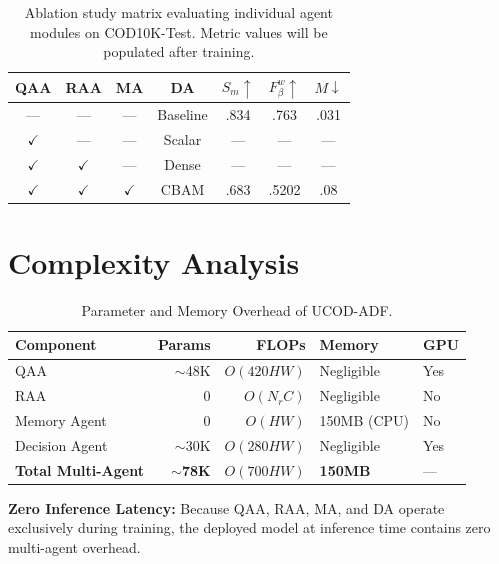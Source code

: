 \documentclass[journal,twoside,web]{IEEEtran}
\newcommand{\methodname}{UCOD-ADF}
\newcommand{\PENDING}{---}
\begin{document}
\begin{table}[h]
\centering
\caption{Ablation study matrix evaluating individual agent modules on COD10K-Test. Metric values will be populated after training.}
\label{tab:ablation}
\begin{tabular}{cccc|ccc}
\toprule
QAA & RAA & MA & DA & $S_m\uparrow$ & $F_\beta^w\uparrow$ & $M\downarrow$ \\
\midrule
--- & --- & --- & Baseline & .834 & .763 & .031 \\
$\checkmark$ & --- & --- & Scalar & \PENDING & \PENDING & \PENDING \\
$\checkmark$ & $\checkmark$ & --- & Dense & \PENDING & \PENDING & \PENDING \\
$\checkmark$ & $\checkmark$ & $\checkmark$ & CBAM & .683 & .5202 & .08 \\
\bottomrule
\end{tabular}
\end{table}

\section{Complexity Analysis}
\label{sec:complexity}

\begin{table}[h]
\centering
\caption{Parameter and Memory Overhead of \methodname{}.}
\label{tab:complexity}
\begin{tabular}{lrrll}
\toprule
Component & Params & FLOPs & Memory & GPU \\
\midrule
QAA & $\sim$48K & $O(420HW)$ & Negligible & Yes \\
RAA & 0 & $O(N_r C)$ & Negligible & No \\
Memory Agent & 0 & $O(HW)$ & 150MB (CPU) & No \\
Decision Agent & $\sim$30K & $O(280HW)$ & Negligible & Yes \\
\midrule
\textbf{Total Multi-Agent} & \textbf{$\sim$78K} & $O(700HW)$ & \textbf{150MB} & --- \\
\bottomrule
\end{tabular}
\end{table}

\textbf{Zero Inference Latency:} Because QAA, RAA, MA, and DA operate exclusively during training, the deployed model at inference time contains zero multi-agent overhead.
\end{document}
